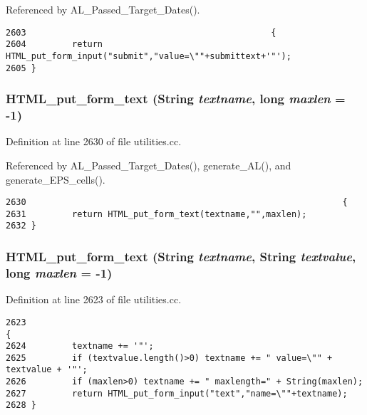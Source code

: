 Referenced by AL\_\-Passed\_\-Target\_\-Dates().



\footnotesize\begin{verbatim}2603                                                {
2604         return HTML_put_form_input("submit","value=\""+submittext+'"');
2605 }
\end{verbatim}\normalsize 
{}
\subsubsection{ HTML\_\-put\_\-form\_\-text ({\bf String} {\em textname}, long {\em maxlen} = -1)}\label{dil2al_8hh_a276}




Definition at line 2630 of file utilities.cc.

Referenced by AL\_\-Passed\_\-Target\_\-Dates(), generate\_\-AL(), and generate\_\-EPS\_\-cells().



\footnotesize\begin{verbatim}2630                                                              {
2631         return HTML_put_form_text(textname,"",maxlen);
2632 }
\end{verbatim}\normalsize 
{}
\subsubsection{ HTML\_\-put\_\-form\_\-text ({\bf String} {\em textname}, {\bf String} {\em textvalue}, long {\em maxlen} = -1)}\label{dil2al_8hh_a275}




Definition at line 2623 of file utilities.cc.



\footnotesize\begin{verbatim}2623                                                                                {
2624         textname += '"';
2625         if (textvalue.length()>0) textname += " value=\"" + textvalue + '"';
2626         if (maxlen>0) textname += " maxlength=" + String(maxlen);
2627         return HTML_put_form_input("text","name=\""+textname);
2628 }
\end{verbatim}\normalsize 
{}
